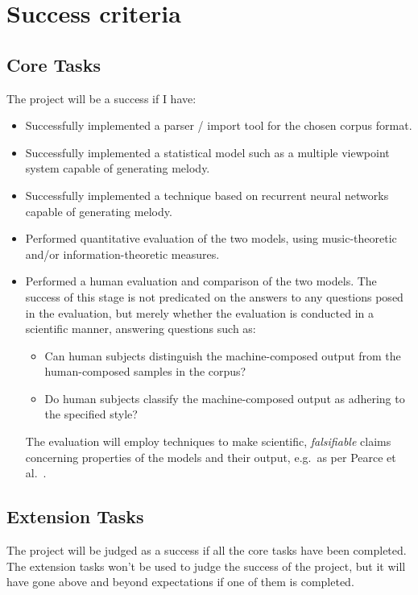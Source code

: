 \documentclass[12pt,a4paper,twoside]{article}
\begin{document}
\section{Success criteria}

\subsection{Core Tasks}

The project will be a success if I have:
\begin{itemize}
  \item Successfully implemented a parser / import tool for the chosen corpus
    format.
	\item Successfully implemented a statistical model such as a multiple
		viewpoint system capable of generating melody.
	\item Successfully implemented a technique based on recurrent neural
		networks capable of generating melody.
  \item Performed quantitative evaluation of the two models, using
    music-theoretic and/or information-theoretic measures.
  \item Performed a human evaluation and comparison of the two models. The
    success of this stage is not predicated on the answers to any questions
    posed in the evaluation, but merely whether the evaluation is conducted in a
    scientific manner, answering questions such as:
	\begin{itemize}
		\item Can human subjects distinguish the machine-composed output
			from the human-composed samples in the corpus?
		\item Do human subjects classify the machine-composed output as
			adhering to the specified style?
	\end{itemize}
  
  The evaluation will employ techniques to make scientific, \emph{falsifiable}
  claims concerning properties of the models and their output, e.g.\ as per
  Pearce et al.\ 
  \cite{pearce2001evaluation}.

	\end{itemize}

\subsection{Extension Tasks}

The project will be judged as a success if all the core tasks have been
completed. The extension tasks won't be used to judge the success of the
project, but it will have gone above and beyond expectations if one of them is
completed.
\end{document}
